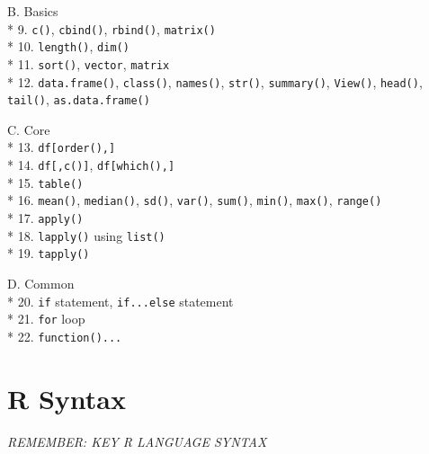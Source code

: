 \documentclass[]{book}
\begin{document}
B. Basics\\
* 9. \texttt{c()}, \texttt{cbind()}, \texttt{rbind()}, \texttt{matrix()}\\
* 10. \texttt{length()}, \texttt{dim()}\\
* 11. \texttt{sort()}, \texttt{\textquotesingle{}vector\textquotesingle{}{[}{]}}, \texttt{\textquotesingle{}matrix\textquotesingle{}{[}{]}}\\
* 12. \texttt{data.frame()}, \texttt{class()}, \texttt{names()}, \texttt{str()}, \texttt{summary()}, \texttt{View()}, \texttt{head()}, \texttt{tail()}, \texttt{as.data.frame()}

C. Core\\
* 13. \texttt{df{[}order(),{]}}\\
* 14. \texttt{df{[},c(){]}}, \texttt{df{[}which(),{]}}\\
* 15. \texttt{table()}\\
* 16. \texttt{mean()}, \texttt{median()}, \texttt{sd()}, \texttt{var()}, \texttt{sum()}, \texttt{min()}, \texttt{max()}, \texttt{range()}\\
* 17. \texttt{apply()}\\
* 18. \texttt{lapply()} using \texttt{list()}\\
* 19. \texttt{tapply()}

D. Common\\
* 20. \texttt{if} statement, \texttt{if...else} statement\\
* 21. \texttt{for} loop\\
* 22. \texttt{function()...}

\hypertarget{r-syntax}{%
\section{R Syntax}\label{r-syntax}}

\emph{REMEMBER: KEY R LANGUAGE SYNTAX}
\end{document}
